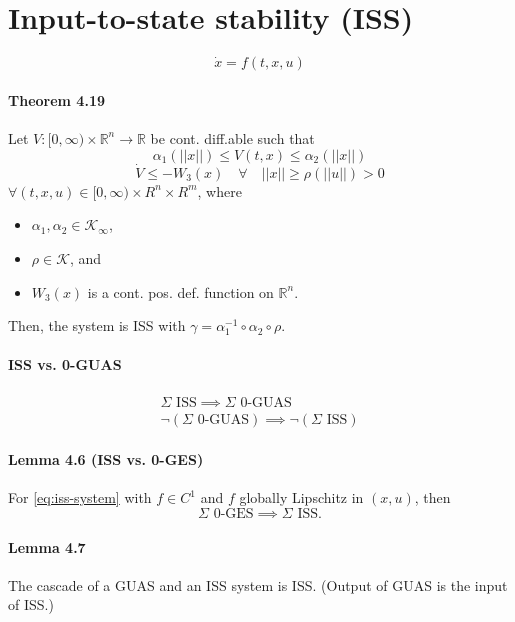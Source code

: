\section{Input-to-state stability (ISS)}

\begin{equation}\label{eq:iss-system}
	\dot{x} = f(t,x,u)
\end{equation}

\paragraph{Theorem 4.19}
Let $V : [0,\infty) \times \mathbb{R}^n \to \mathbb{R}$ be cont. diff.able such that
\begin{equation}
	\alpha_1 \left( ||x|| \right) \leq V(t,x) \leq \alpha_2 \left( ||x|| \right)
\end{equation}
\begin{equation}
	\dot{V} \leq -W_3(x) \quad \forall \quad ||x|| \geq \rho \left( ||u|| \right) > 0
\end{equation}
$\forall (t,x,u) \in [0,\infty) \times R^n \times R^m$, where
\begin{itemize}
	\item $\alpha_1, \alpha_2 \in \mathcal{K}_\infty$,
	\item $\rho \in \mathcal{K}$, and
	\item $W_3(x)$ is a cont. pos. def. function on $\mathbb{R}^n$.
\end{itemize}
Then, the system is ISS with $\gamma=\alpha_1^{-1} \circ \alpha_2 \circ \rho$.

\paragraph{ISS vs. 0-GUAS}
\begin{gather}
	\Sigma \mbox{ ISS} \implies \Sigma \mbox{ 0-GUAS} \\
	\neg (\Sigma \mbox{ 0-GUAS}) \implies \neg (\Sigma \mbox{ ISS})
\end{gather}

\paragraph{Lemma 4.6 (ISS vs. 0-GES)}
For \eqref{eq:iss-system} with $f \in C^1$ and $f$ globally Lipschitz in $(x,u)$, then
\begin{equation}
	\Sigma \mbox{ 0-GES} \implies \Sigma \mbox{ ISS}
	.
\end{equation}

\paragraph{Lemma 4.7}
The cascade of a GUAS and an ISS system is ISS. (Output of GUAS is the input of ISS.)
